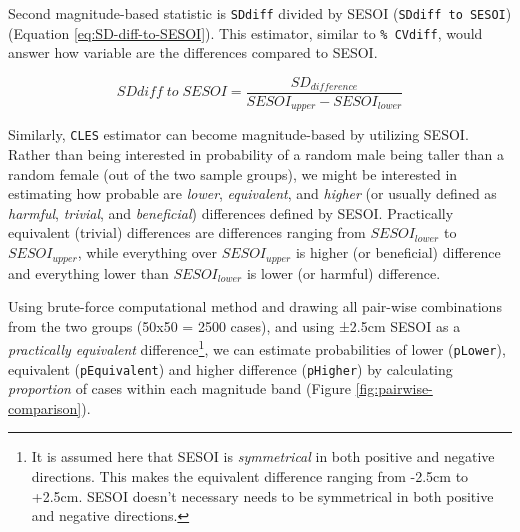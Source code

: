 \documentclass[
]{book}
\begin{document}
Second magnitude-based statistic is \texttt{SDdiff} divided by SESOI (\texttt{SDdiff\ to\ SESOI}) (Equation \eqref{eq:SD-diff-to-SESOI}). This estimator, similar to \texttt{\%\ CVdiff}, would answer how variable are the differences compared to SESOI.

\begin{equation}
  SDdiff\;to\;SESOI = \frac{SD_{difference}}{SESOI_{upper} - SESOI_{lower}}
  \label{eq:SD-diff-to-SESOI}
\end{equation}

Similarly, \texttt{CLES} estimator can become magnitude-based by utilizing SESOI. Rather than being interested in probability of a random male being taller than a random female (out of the two sample groups), we might be interested in estimating how probable are \emph{lower}, \emph{equivalent}, and \emph{higher} (or usually defined as \emph{harmful}, \emph{trivial}, and \emph{beneficial}) differences defined by SESOI. Practically equivalent (trivial) differences are differences ranging from \(SESOI_{lower}\) to \(SESOI_{upper}\), while everything over \(SESOI_{upper}\) is higher (or beneficial) difference and everything lower than \(SESOI_{lower}\) is lower (or harmful) difference.

Using brute-force computational method and drawing all pair-wise combinations from the two groups (50x50 = 2500 cases), and using ±2.5cm SESOI as a \emph{practically equivalent} difference\footnote{It is assumed here that SESOI is \emph{symmetrical} in both positive and negative directions. This makes the equivalent difference ranging from -2.5cm to +2.5cm. SESOI doesn't necessary needs to be symmetrical in both positive and negative directions.}, we can estimate probabilities of lower (\texttt{pLower}), equivalent (\texttt{pEquivalent}) and higher difference (\texttt{pHigher}) by calculating \emph{proportion} of cases within each magnitude band (Figure \ref{fig:pairwise-comparison}).
\end{document}
